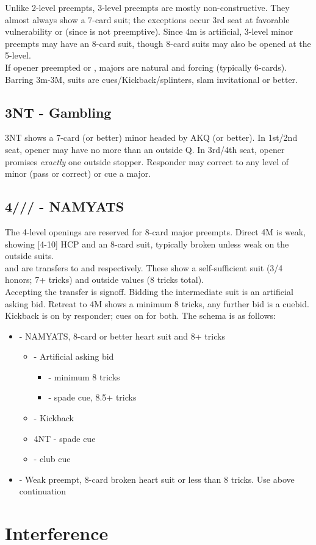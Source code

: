 \documentclass[12pt]{report}
\newcommand{\n}{\\}
\newcommand{\ul}[1]{\begin{itemize}#1\end{itemize}}
\newcommand{\li}{\item[~]}
\newcommand{\bidsection}[2]{\section{\texorpdfstring{#1}{#2}}}
\begin{document}
    Unlike 2-level preempts, 3-level preempts are mostly non-constructive.  They almost always show a 7-card suit; the exceptions occur 3rd seat at favorable vulnerability or  (since  is not preemptive).  Since 4m is artificial, 3-level minor preempts may have an 8-card suit, though 8-card suits may also be opened at the 5-level. \n

    If opener preempted  or , majors are natural and forcing (typically 6-cards).  Barring 3m-3M, suits are cues/Kickback/splinters, slam invitational or better.

\bidsection{3NT - Gambling}{3NT - Gambling} \label{2:11}

    3NT shows a 7-card (or better) minor headed by AKQ (or better).  In 1st/2nd seat, opener may have no more than an outside Q.  In 3rd/4th seat, opener promises \textit{exactly} one outside stopper. Responder may correct to any level of minor (pass or correct) or cue a major.

\bidsection{4\cl{}/\di{}/\he{}/\sp{} - NAMYATS}{4♣/♢/♡/♠ - NAMYATS} \label{2:12}

    The 4-level openings are reserved for 8-card major preempts.  Direct 4M is weak, showing [4-10] HCP and an 8-card suit, typically broken unless weak on the outside suits.\n

     and  are transfers to  and  respectively.  These show a self-sufficient suit (3/4 honors; 7+ tricks) and outside values (8 tricks total).\n

    Accepting the transfer is signoff.  Bidding the intermediate suit is an artificial asking bid.  Retreat to 4M shows a minimum 8 tricks, any further bid is a cuebid.\n

    Kickback is on by responder; cues on for both.  The schema is as follows:

    \ul {
        \li {} - NAMYATS, 8-card or better heart suit and 8+ tricks
        \ul {
            \li \di4 - Artificial asking bid
            \ul {
                \li \he4 - minimum 8 tricks
                \li \sp4 - spade cue, 8.5+ tricks
            }
            \li \sp4 - Kickback
            \li 4NT - spade cue
            \li \cl5 - club cue
        }
        \li \he4 - Weak preempt, 8-card broken heart suit or less than 8 tricks.  Use above continuation
    }

\chapter{Interference}  \label{3}
\end{document}
